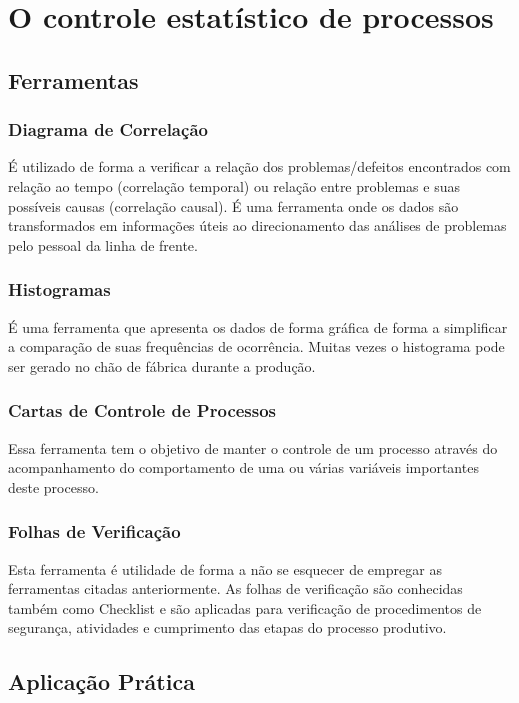 \chapter{O controle estatístico de processos}
\label{chap:controle_estatistico_de_processos}



\section{Ferramentas}
\label{sec:controle_estatistico_sec1}

\subsection{Diagrama de Correlação}
É utilizado de forma a verificar a relação dos problemas/defeitos encontrados com relação ao tempo (correlação temporal) ou relação entre problemas e suas possíveis causas (correlação causal). É uma ferramenta onde os dados são transformados em informações úteis ao direcionamento das análises de problemas pelo pessoal da linha de frente.

\subsection{Histogramas}
É uma ferramenta que apresenta os dados de forma gráfica de forma a simplificar a comparação de suas frequências de ocorrência. Muitas vezes o histograma pode ser gerado no chão de fábrica durante a produção.

\subsection{Cartas de Controle de Processos}
Essa ferramenta tem o objetivo de manter o controle de um processo através do acompanhamento do comportamento de uma ou várias variáveis importantes deste processo.

\subsection{Folhas de Verificação}
Esta ferramenta é utilidade de forma a não se esquecer de empregar as ferramentas citadas anteriormente. As folhas de verificação são conhecidas também como Checklist e são aplicadas para verificação de procedimentos de segurança, atividades e cumprimento das etapas do processo produtivo.




\section{Aplicação Prática}
\label{sec:controle_estatistico_aplicacao}
